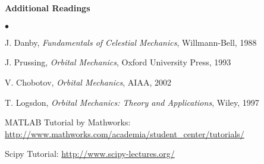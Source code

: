 \documentclass[10pt]{article}
\begin{document}
\paragraph*{Additional Readings}
\begin{list}
{$\bullet$}
{\setlength{\itemsep}{-3pt}}
\item {}
\item {}
\item J. Danby, \textit{Fundamentals of Celestial Mechanics}, Willmann-Bell, 1988
\item J. Prussing, \textit{Orbital Mechanics}, Oxford University Press, 1993
\item V. Chobotov, \textit{Orbital Mechanics}, AIAA, 2002
\item T. Logsdon, \textit{Orbital Mechanics: Theory and Applications}, Wiley, 1997
\item MATLAB Tutorial by Mathworks: \url{http://www.mathworks.com/academia/student_center/tutorials/}
\item Scipy Tutorial: \href{http://www.scipy-lectures.org/}{http://www.scipy-lectures.org/}
\end{list}
\end{document}
